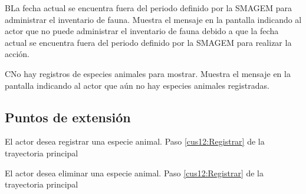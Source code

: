     \begin{UCtrayectoriaA}{B}{La fecha actual se encuentra fuera del periodo definido por la SMAGEM para administrar el inventario de fauna.}
    \UCpaso[\UCsist] Muestra el mensaje  en la pantalla  indicando al actor que no puede administrar el inventario de fauna debido a que la fecha actual se encuentra fuera del periodo definido por la SMAGEM para realizar la acción. 
 \end{UCtrayectoriaA}
 
  \begin{UCtrayectoriaA}{C}{No hay registros de especies animales para mostrar.}
    \UCpaso[\UCsist] Muestra el mensaje  en la pantalla  indicando al actor que aún no hay especies animales registradas. 
 \end{UCtrayectoriaA}


\subsection{Puntos de extensión}

\UCExtensionPoint
{El actor desea registrar una especie animal.}
{ Paso \ref{cus12:Registrar} de la trayectoria principal}
{}

\UCExtensionPoint
{El actor desea eliminar una especie animal.}
{ Paso \ref{cus12:Registrar} de la trayectoria principal}
{}
